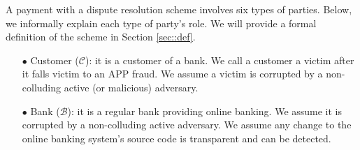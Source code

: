 A payment with a dispute resolution scheme involves six types of parties. Below, we informally explain each type of party's role. 
%
%
We will provide a formal definition of the scheme in Section \ref{sec::def}. 
%
\vspace{-2mm}
\begin{itemize}[leftmargin=3.8mm]
%

\item[$\bullet$] Customer ($\mathcal{C}$): it is a customer of a bank. We call a customer a victim after it falls victim to an APP fraud. We assume a victim is corrupted by a non-colluding active (or malicious) adversary. %
%
\item[$\bullet$] Bank ($\mathcal{B}$): it is a regular bank providing online banking. We assume it is corrupted by a non-colluding active adversary. We assume any change to the online banking system's source code is transparent and can be detected. 



\end{itemize}
